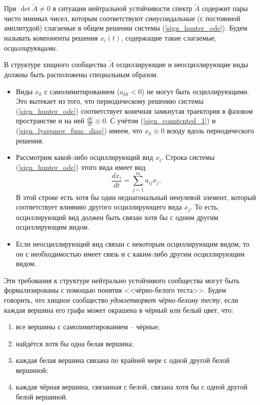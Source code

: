     При \(\det \widetilde{A} \neq 0\) в ситуации нейтральной устойчивости спектр \(\widetilde{A}\) содержит пары чисто мнимых чисел, которым соответствуют синусоидальные (с постоянной амплитудой) слагаемые в общем решении системы (\ref{sign_hunter_ode}). Будем называть компоненты решения \(x_i(t)\), содержащие такие слагаемые, \textit{осциллирующими}.
    
    В структуре хищного сообщества \(\widetilde{A}\) осциллирующие и неосциллирующие виды должны быть расположены специальным образом. 
    \begin{itemize}
        \item Виды \(x_k\) с самолимитированием (\(a_{kk} < 0\)) не могут быть осциллирующими. Это вытекает из того, что периодическому решению системы (\ref{sign_hunter_ode}) соответствует конечная замкнутая траектория в фазовом пространстве и на ней \( \frac{d V}{d t} \equiv 0 \). С учётом (\ref{sign_conntcnted_1}) и (\ref{sign_lyapunov_func_diag}) имеем, что \(x_k \equiv 0\) всюду вдоль периодического решения.
        
        \item Рассмотрим какой-либо осциллирующий вид \(x_i\). Строка системы (\ref{sign_hunter_ode}) этого вида имеет вид
        \begin{equation*}
            \frac{dx_i}{dt} = \sum_{j=1}^{m} a_{ij} x_j.
        \end{equation*}
        В этой строке есть хотя бы один недиагональный ненулевой элемент, который соответствует влиянию другого осциллирующего вида \(x_j\). То есть, осциллирующий вид должен быть связан хотя бы с одним другим осциллирующим видом.

        \item Если неосциллирующий вид связан с некоторым осциллирующим видом, то он с необходимостью имеет связь и с каким-либо другим осциллирующим видом. \cite{svilog}
    \end{itemize}

    Эти требования к структуре нейтрально устойчивого сообщества могут быть формализированы с помощью понятия <<чёрно-белого теста>>. Будем говорить, что хищное сообщество \textit{удовлетворяет чёрно-белому тесту}, если каждая вершина его графа может окрашена в чёрный или белый цвет, что:
    \begin{enumerate}[label={\asbuk*)}, ref=\asbuk*]
        \item все вершины с самолимитированием -- чёрные; \label{black_white_a}
        \item найдётся хотя бы одна белая вершина; \label{black_white_b}
        \item каждая белая вершина связана по крайней мере с одной другой белой вершиной; \label{black_white_c}
        \item каждая чёрная вершина, связанная с белой, связана хотя бы с одной другой белой вершиной. \label{black_white_d}
    \end{enumerate}

